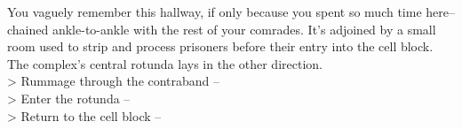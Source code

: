 You vaguely remember this hallway, if only because you spent so much time here--chained ankle-to-ankle with the rest of your comrades. It’s adjoined by a small room used to strip and process prisoners before their entry into the cell block. The complex’s central rotunda lays in the other direction.\\

> Rummage through the contraband -- \\
> Enter the rotunda -- \\
> Return to the cell block -- 
